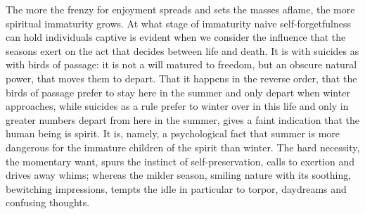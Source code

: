 \documentclass[12pt,a4paper,openany]{book}
\newcommand{\opage}[1]{\marginnote{\footnotesize\textit{[#1]}}}
\begin{document}
\setcounter{footnote}{0}%
\opage{702}The more the frenzy for enjoyment spreads and sets the masses aflame, the more spiritual immaturity grows. At what stage of immaturity naive self-forgetfulness can hold individuals captive is evident when we consider the influence that the seasons exert on the act that decides between life and death. It is with suicides as with birds of passage: it is not a will matured to freedom, but an obscure natural power, that moves them to depart. That it happens in the reverse order, that the birds of passage prefer to stay here in the summer and only depart when winter approaches, while suicides as a rule prefer to winter over in this life and only in greater numbers depart from here in the summer, gives a faint indication that the human being is spirit. It is, namely, a psychological fact that summer is more dangerous for the immature children of the spirit than winter. The hard necessity, the momentary want, spurs the instinct of self-preservation, calls to exertion and drives away whims; whereas the milder season, smiling nature with its soothing, bewitching impressions, tempts the idle in particular to torpor, daydreams and confusing thoughts.
\end{document}
